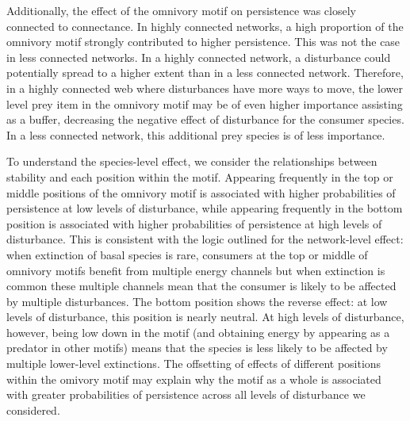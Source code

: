 \documentclass[12pt]{article}
\begin{document}
\begin{spacing}{2.0}
Additionally, the effect of the omnivory motif on persistence was closely connected to connectance. In highly connected networks, a high proportion of the omnivory motif strongly contributed to higher persistence. This was not the case in less connected networks. 
In a highly connected network, a disturbance could potentially spread to a higher extent than in a less connected network. 
Therefore, in a highly connected web where disturbances have more ways to move, the lower level prey item in the omnivory motif may be of even higher importance assisting as a buffer, decreasing the negative effect of disturbance for the consumer species. In a less connected network, this additional prey species is of less importance.

To understand the species-level effect, we consider the relationships between stability and each position within the motif.
Appearing frequently in the top or middle positions of the omnivory motif is associated with higher probabilities of persistence at low levels of disturbance, while appearing frequently in the bottom position is associated with higher probabilities of persistence at high levels of disturbance.
This is consistent with the logic outlined for the network-level effect: when extinction of basal species is rare, consumers at the top or middle of omnivory motifs benefit from multiple energy channels but when extinction is common these multiple channels mean that the consumer is likely to be affected by multiple disturbances. The bottom position shows the reverse effect: at low levels of disturbance, this position is nearly neutral.  At high levels of disturbance, however, being low down in the motif (and obtaining energy by appearing as a predator in other motifs) means that the species is less likely to be affected by multiple lower-level extinctions.
The offsetting of effects of different positions within the omivory motif may explain why the motif as a whole is associated with greater probabilities of persistence across all levels of disturbance we considered.




\end{spacing}
\end{document}
